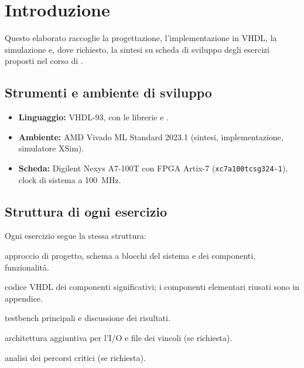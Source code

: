 \chapter*{Introduzione}

Questo elaborato raccoglie la progettazione, l'implementazione in VHDL, la simulazione e,
dove richiesto, la sintesi su scheda di sviluppo degli esercizi proposti nel corso di
\thecorso. 

\section*{Strumenti e ambiente di sviluppo}

\begin{itemize}[nosep]
	\item \textbf{Linguaggio:} VHDL-93, con le librerie  e .
	\item \textbf{Ambiente:} AMD Vivado ML Standard 2023.1 (sintesi, implementazione, simulatore XSim).
	\item \textbf{Scheda:} Digilent Nexys A7-100T con FPGA Artix-7
	      (\texttt{xc7a100tcsg324-1}), clock di sistema a \SI{100}{\mega\hertz}.
\end{itemize}

\section*{Struttura di ogni esercizio}

Ogni esercizio segue la stessa struttura:
\begin{description}[nosep, font=\sffamily\bfseries]
	\item[Progetto e architettura] approccio di progetto, schema a blocchi del sistema e dei componenti, funzionalità.
	\item[Implementazione] codice VHDL dei componenti significativi; i componenti elementari riusati sono in appendice.
	\item[Simulazione] testbench principali e discussione dei risultati.
	\item[Sintesi su board di sviluppo] architettura aggiuntiva per l'I/O e file dei vincoli (se richiesta).
	\item[Timing analysis] analisi dei percorsi critici (se richiesta).
\end{description}

